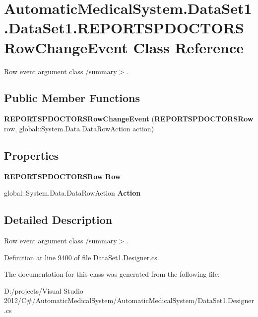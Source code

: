 \section{AutomaticMedicalSystem.DataSet1.DataSet1.REPORTSPDOCTORSRowChangeEvent Class Reference}
\label{class_automatic_medical_system_1_1_data_set1_1_1_r_e_p_o_r_t_s_p_d_o_c_t_o_r_s_row_change_event}
Row event argument class /summary$>$.  


\subsection*{Public Member Functions}
\begin{CompactItemize}
\item 
\textbf{REPORTSPDOCTORSRowChangeEvent} ({\bf REPORTSPDOCTORSRow} row, global::System.Data.DataRowAction action)\label{class_automatic_medical_system_1_1_data_set1_1_1_r_e_p_o_r_t_s_p_d_o_c_t_o_r_s_row_change_event_55b9aa41c7cfc3a4aa90fa397f9f9187}

\end{CompactItemize}
\subsection*{Properties}
\begin{CompactItemize}
\item 
{\bf REPORTSPDOCTORSRow} \textbf{Row}\hspace{0.3cm}{\tt  [get]}\label{class_automatic_medical_system_1_1_data_set1_1_1_r_e_p_o_r_t_s_p_d_o_c_t_o_r_s_row_change_event_93437b95790fc36fe46d7b82da8723b5}

\item 
global::System.Data.DataRowAction \textbf{Action}\hspace{0.3cm}{\tt  [get]}\label{class_automatic_medical_system_1_1_data_set1_1_1_r_e_p_o_r_t_s_p_d_o_c_t_o_r_s_row_change_event_1532f1254369053dcc32ebad7e8925d0}

\end{CompactItemize}


\subsection{Detailed Description}
Row event argument class /summary$>$. 

Definition at line 9400 of file DataSet1.Designer.cs.

The documentation for this class was generated from the following file:\begin{CompactItemize}
\item 
D:/projects/Visual Studio 2012/C\#/AutomaticMedicalSystem/AutomaticMedicalSystem/DataSet1.Designer.cs\end{CompactItemize}
